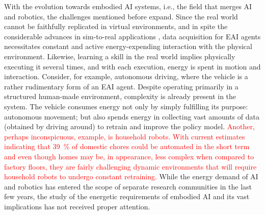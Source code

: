 With the evolution towards embodied AI systems, i.e., the field that merges AI and robotics, the challenges mentioned before expand. Since the real world cannot be faithfully replicated in virtual environments, and in spite the considerable advances in sim-to-real applications \cite{Chebotar2019Closingsimreal}, data acquisition for EAI agents necessitates constant and active energy-expending interaction with the physical environment. Likewise, learning a skill in the real world implies physically executing it several times, and with each execution, energy is spent in motion and interaction. Consider, for example, autonomous driving, where the vehicle is a rather rudimentary form of an EAI agent. Despite operating primarily in a structured human-made environment, complexity is already present in the system. The vehicle consumes energy not only by simply fulfilling its purpose: autonomous movement; but also spends energy in collecting vast amounts of data (obtained by driving around) to retrain and improve the policy model. \textcolor{red}{Another, perhaps inconspicuous, example, is household robots. With current estimates indicating that 39~\%  of domestic chores could be automated in the short term \cite{Lehdonvirta2022futuresunpaidwork} and even though homes may be, in appearance, less complex when compared to factory floors, they are fairly challenging dynamic environments that will require household robots to undergo constant retraining.} While the energy demand of AI and robotics has entered the scope of separate research communities in the last few years, the study of the energetic requirements of embodied AI and its vast implications has not received proper attention. 

